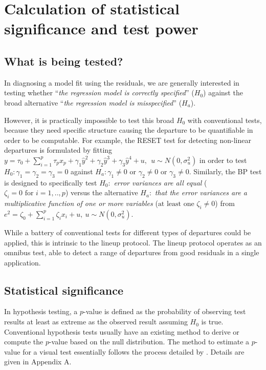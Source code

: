 \documentclass[]{interact}
\theoremstyle{plain}%
\theoremstyle{definition}
\theoremstyle{remark}
\begin{document}
\hypertarget{significance-calculation}{%
\section{Calculation of statistical significance and test
power}\label{significance-calculation}}

\hypertarget{what-is-being-tested}{%
\subsection{What is being tested?}\label{what-is-being-tested}}

In diagnosing a model fit using the residuals, we are generally
interested in testing whether ``\emph{the regression model is correctly
specified}'' (\(H_0\)) against the broad alternative ``\emph{the
regression model is misspecified}'' (\(H_a\)).

However, it is practically impossible to test this broad \(H_0\) with
conventional tests, because they need specific structure causing the
departure to be quantifiable in order to be computable. For example, the
RESET test for detecting non-linear departures is formulated by fitting
\(y = \tau_0 + \sum_{i=1}^{p}\tau_px_p +\gamma_1\hat{y}^2 + \gamma_2\hat{y}^3 + \gamma_3\hat{y}^4 + u, ~~u \sim N(0, \sigma_u^2)\)
in order to test \(H_0:\gamma_1 = \gamma_2 = \gamma_3 = 0\) against
\(H_a: \gamma_1 \neq 0 \text{ or } \gamma_2 \neq 0 \text{ or } \gamma_3 \neq 0\).
Similarly, the BP test is designed to specifically test \(H_0:\)
\emph{error variances are all equal}
(\(\zeta_i=0 \text{ for } i=1,..,p\)) versus the alternative \(H_a:\)
\emph{that the error variances are a multiplicative function of one or
more variables} (\(\text{at least one } \zeta_i\neq 0\)) from
\(e^2 = \zeta_0 + \sum_{i=1}^{p}\zeta_i x_i + u, ~ u\sim N(0,\sigma_u^2)\).

While a battery of conventional tests for different types of departures
could be applied, this is intrinsic to the lineup protocol. The lineup
protocol operates as an omnibus test, able to detect a range of
departures from good residuals in a single application.

\hypertarget{statistical-significance}{%
\subsection{\texorpdfstring{Statistical
significance\label{sig}}{Statistical significance}}\label{statistical-significance}}

In hypothesis testing, a \(p\)-value is defined as the probability of
observing test results at least as extreme as the observed result
assuming \(H_0\) is true. Conventional hypothesis tests usually have an
existing method to derive or compute the \(p\)-value based on the null
distribution. The method to estimate a \(p\)-value for a visual test
essentially follows the process detailed by
\citet{vanderplas2021statistical}. Details are given in Appendix A.
\end{document}
